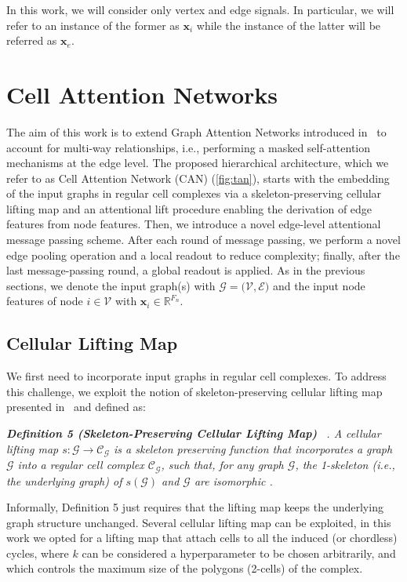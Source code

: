 \documentclass{article}
\begin{document}
In this work, we will consider only vertex and edge signals. In particular, we will refer to an instance of the former as $\mathbf{x}_{i}$ while the instance of the latter will be referred as $\mathbf{x}_{e}$. 


\section{Cell Attention Networks}\label{sec:can}

The aim of this work is to extend Graph Attention Networks introduced in~\cite{velivckovic2017graph} to account for multi-way relationships, i.e., performing a masked self-attention mechanisms at the edge level. The proposed hierarchical architecture, which we refer to as Cell Attention Network (CAN) (\ref{fig:tan}), starts with the embedding of the input graphs in regular cell complexes via a skeleton-preserving cellular lifting map and an attentional lift procedure enabling the derivation of edge features from node features. Then, we introduce a novel edge-level attentional message passing scheme. After each round of message passing, we perform a novel edge pooling operation and a local readout to reduce complexity; finally, after the last message-passing round, a global readout is applied. As in the previous sections, we denote the input graph(s) with $\mathcal{G}=(\mathcal{V},\mathcal{E)}$ and the input node features of node $i \in \mathcal{V}$ with $\mathbf{x}_i \in \mathbb{R}^{F_n}$.

\subsection{Cellular Lifting Map}

We first need to incorporate input graphs in  regular cell complexes. To address this challenge, we exploit the notion of skeleton-preserving cellular lifting map presented in~\cite{bodnarcwnet} and defined as:

\textit{\textbf{Definition 5 (Skeleton-Preserving Cellular Lifting Map) }~\cite{bodnarcwnet}. A cellular lifting map $s: \mathcal{G} \rightarrow \mathcal{C}_{\mathcal{G}}$ is a skeleton preserving function that incorporates a graph $\mathcal{G}$ into a regular cell complex $\mathcal{C}_{\mathcal{G}}$, such that, for any graph $\mathcal{G}$, the 1-skeleton (i.e., the underlying graph) of  $s(\mathcal{G})$ and $\mathcal{G}$ are isomorphic .}

Informally, Definition 5 just requires that the lifting map keeps the underlying graph structure unchanged. Several cellular lifting map can be exploited, in this work we opted for a lifting map that attach cells to all the induced (or chordless) cycles, where $k$ can be considered a hyperparameter to be chosen arbitrarily, and which controls the maximum size of the polygons (2-cells) of the complex. 
\end{document}
